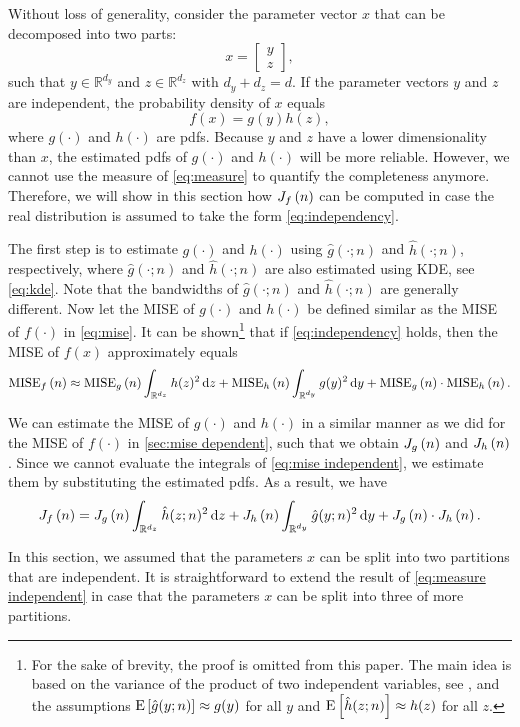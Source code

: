 Without loss of generality, consider the parameter vector $x$ that can be decomposed into two parts:
\begin{equation}
	\label{eq:combine}
	x = \begin{bmatrix}
		y \\ z
	\end{bmatrix},
\end{equation}
such that $y \in \mathbb{R}^{d_y}$ and $z \in \mathbb{R}^{d_z}$ with $d_y+d_z=d$. If the parameter vectors $y$ and $z$ are independent, the probability density of $x$ equals
\begin{equation}
	\label{eq:independency}
	f(x) = g(y) h(z),
\end{equation}
where $g(\cdot)$ and $h(\cdot)$ are pdfs.
Because $y$ and $z$ have a lower dimensionality than $x$, the estimated pdfs of $g(\cdot)$ and $h(\cdot)$ will be more reliable. However, we cannot use the measure of \cref{eq:measure} to quantify the completeness anymore. Therefore, we will show in this section how $J_{f} \left( n \right)$ can be computed in case the real distribution is assumed to take the form \cref{eq:independency}.

The first step is to estimate $g(\cdot)$ and $h(\cdot)$ using $\hat{g}(\cdot;n)$ and $\hat{h}(\cdot;n)$, respectively, where $\hat{g}(\cdot;n)$ and $\hat{h}(\cdot;n)$ are 
\cstart
also estimated using KDE, see 
\cend
\cref{eq:kde}. Note that the bandwidths of $\hat{g}(\cdot;n)$ and $\hat{h}(\cdot;n)$ are generally different. Now let the MISE of $g(\cdot)$ and $h(\cdot)$ be defined similar as the MISE of $f(\cdot)$ in \cref{eq:mise}. It can be shown\footnote{For the sake of brevity, the proof is omitted from this paper. The main idea is based on the variance of the product of two independent variables, see \textcite{goodman1960exact}, and the assumptions $\textup{E} \left[ \hat{g}(y;n) \right] \approx g(y)$ for all $y$ and $\textup{E} \left[ \hat{h}(z;n) \right] \approx h(z)$ for all $z$.} that if \cref{eq:independency} holds, then the MISE of $f(x)$ approximately equals
\begin{dmath}
	\label{eq:mise independent}
	\mise{f}{n} \approx \mise{g}{n} \int_{\mathbb{R}^{d_z}} h(z)^2 \ud z + \mise{h}{n} \int_{\mathbb{R}^{d_y}} g(y)^2 \ud y + \mise{g}{n} \cdot \mise{h}{n}.
\end{dmath}

We can estimate the MISE of $g(\cdot)$ and $h(\cdot)$ in a similar manner as we did for the MISE of $f(\cdot)$ in \cref{sec:mise dependent}, such that we obtain $J_{g} \left( n \right)$ and $J_{h} \left( n \right)$. Since we cannot evaluate the integrals of \cref{eq:mise independent}, we estimate them by substituting the estimated pdfs. As a result, we have
\begin{dmath}
	\label{eq:measure independent}
	\measure{f}{n} = \measure{g}{n} \int_{\mathbb{R}^{d_z}} \hat{h}(z;n)^2 \ud z + \measure{h}{n} \int_{\mathbb{R}^{d_y}} \hat{g}(y;n)^2 \ud y + \measure{g}{n} \cdot \measure{h}{n}.
\end{dmath}

In this section, we assumed that the parameters $x$ can be split into two partitions that are independent. It is straightforward to extend the result of \cref{eq:measure independent} in case that the parameters $x$ can be split into three of more partitions. 
